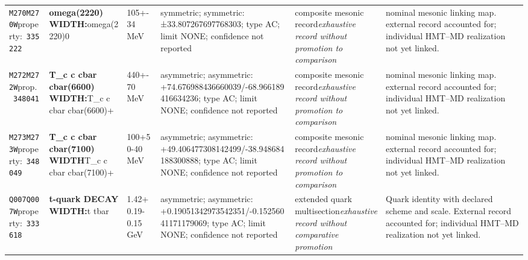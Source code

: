 \begin{landscape}
\begin{longtable}{L{1.85cm}L{4.45cm}L{2.35cm}L{4.05cm}L{3.35cm}L{7.15cm}}
\texttt{M270}\newline \texttt{M270W}\newline property:\ \texttt{335222} & \textbf{omega(2220) WIDTH:}\newline omega(2220)0 & 105+-34\,MeV & symmetric; symmetric: ±33.807267697768303; type AC; limit NONE; confidence not reported & composite mesonic record\newline \emph{exhaustive record without promotion to comparison} & nominal mesonic linking map. external record accounted for; individual HMT--MD realization not yet linked. \\
\texttt{M272}\newline \texttt{M272W}\newline prop.\ \texttt{348041} & \textbf{T\_\allowbreak{}c c cbar cbar(6600) WIDTH:}\newline T\_\allowbreak{}c c cbar cbar(6600)+ & 440+-70\,MeV & asymmetric; asymmetric: +74.676988436660039/-68.966189416634236; type AC; limit NONE; confidence not reported & composite mesonic record\newline \emph{exhaustive record without promotion to comparison} & nominal mesonic linking map. external record accounted for; individual HMT--MD realization not yet linked. \\
\texttt{M273}\newline \texttt{M273W}\newline property:\ \texttt{348049} & \textbf{T\_\allowbreak{}c c cbar cbar(7100) WIDTH}\newline T\_\allowbreak{}c c cbar cbar(7100)+ & 100+50-40\,MeV & asymmetric; asymmetric: +49.406477308142499/-38.948684188300888; type AC; limit NONE; confidence not reported & composite mesonic record\newline \emph{exhaustive record without promotion to comparison} & nominal mesonic linking map. external record accounted for; individual HMT--MD realization not yet linked. \\
\texttt{Q007}\newline \texttt{Q007W}\newline property:\ \texttt{333618} & \textbf{t-quark DECAY WIDTH:}\newline t \textbar{}\allowbreak{} tbar & 1.42+0.19-0.15\,GeV & asymmetric; asymmetric: +0.19051342973542351/-0.15256041171179069; type AC; limit NONE; confidence not reported & extended quark multisection\newline \emph{exhaustive record without comparative promotion} & Quark identity with declared scheme and scale. External record accounted for; individual HMT--MD realization not yet linked. \\

\end{longtable}
\end{landscape}
